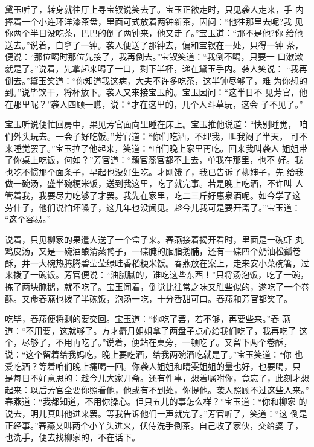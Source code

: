 黛玉听了，转身就往厅上寻宝钗说笑去了。宝玉正欲走时，只见袭人走来，手
内捧着一个小连环洋漆茶盘，里面可式放着两钟新茶，因问：“他往那里去呢?我
见你两个半日没吃茶，巴巴的倒了两钟来，他又走了。”宝玉道：“那不是他?你
给他送去。”说着，自拿了一钟。袭人便送了那钟去，偏和宝钗在一处，只得一钟
茶，便说：“那位喝时那位先接了，我再倒去。”宝钗笑道：“我倒不喝，只要一
口漱漱就是了。”说着，先拿起来喝了一口，剩下半杯，递在黛玉手内。袭人笑说：
“我再倒去。”黛玉笑道：“你知道我这病，大夫不许多吃茶，这半钟尽够了，难
为你想的到。”说毕饮干，将杯放下。袭人又来接宝玉的。宝玉因问：“这半日不
见芳官，他在那里呢？”袭人四顾一瞧，说：“才在这里的，几个人斗草玩，这会
子不见了。”

宝玉听说便忙回房中，果见芳官面向里睡在床上。宝玉推他说道：“快别睡觉，
咱们外头玩去。一会子好吃饭。”芳官道：“你们吃酒，不理我，叫我闷了半天，
可不来睡觉罢了。”宝玉拉了他起来，笑道：“咱们晚上家里再吃。回来我叫袭人
姐姐带了你桌上吃饭，何如？”芳官道：“藕官蕊官都不上去，单我在那里，也不
好。我也吃不惯那个面条子，早起也没好生吃。才刚饿了，我已告诉了柳婶子，先
给我做一碗汤，盛半碗粳米饭，送到我这里，吃了就完事。若是晚上吃酒，不许叫
人管着我，我要尽力吃够了才罢。我先在家里，吃二三斤好惠泉酒呢。如今学了这
劳什子，他们说怕坏嗓子，这几年也没闻见。趁今儿我可是要开斋了。”宝玉道：
“这个容易。”

说着，只见柳家的果遣人送了一个盒子来。春燕接着揭开看时，里面是一碗虾
丸鸡皮汤，又是一碗酒酿清蒸鸭子，一碟腌的胭脂鹅脯，还有一碟四个奶油松瓤卷
酥，并一大碗热腾腾碧莹莹绿畦香稻粳米饭。春燕放在案上，走来安小菜碗箸，过
来拨了一碗饭。芳官便说：“油腻腻的，谁吃这些东西！”只将汤泡饭，吃了一碗，
拣了两块腌鹅，就不吃了。宝玉闻着，倒觉比往常之味又胜些似的，遂吃了一个卷
酥。又命春燕也拨了半碗饭，泡汤一吃，十分香甜可口。春燕和芳官都笑了。

吃毕，春燕便将剩的要交回。宝玉道：“你吃了罢，若不够，再要些来。”春
燕道：“不用要，这就够了。方才麝月姐姐拿了两盘子点心给我们吃了，我再吃了
这个，尽够了，不用再吃了。”说着，便站在桌旁，一顿吃了。又留下两个卷酥，
说：“这个留着给我妈吃。晚上要吃酒，给我两碗酒吃就是了。”宝玉笑道：“你
也爱吃酒？等着咱们晚上痛喝一回。你袭人姐姐和晴雯姐姐的量也好，也要喝，只
是每日不好意思的：趁今儿大家开斋。还有件事，想着嘱咐你，竟忘了，此刻才想
起来：以后芳官全要你照看他，他或有不到处，你提他。袭人照顾不过这些人来。”
春燕道：“我都知道，不用你操心。但只五儿的事怎么样？”宝玉道：“你和柳家
的说去，明儿真叫他进来罢。等我告诉他们一声就完了。”芳官听了，笑道：“这
倒是正经事。”春燕又叫两个小丫头进来，伏侍洗手倒茶。自己收了家伙，交给婆
子，也洗手，便去找柳家的，不在话下。

